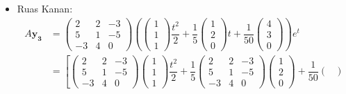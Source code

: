 \documentclass[a4paper]{article}
\theoremstyle{definisi}
\numberwithin{equation}{section}
\begin{document}
\begin{enumerate}
\begin{itemize}
\begin{align*}
\begin{pmatrix}
          \end{pmatrix}+\dfrac{1}{50}\begin{pmatrix}
            14\\23\\0
          \end{pmatrix}
        \right)e^t
      \end{align*}
      \item Ruas Kanan:
      \begin{align*}
        A\mathbf{y_3}&=\begin{pmatrix}
          2&2&-3\\
          5&1&-5\\
          -3&4&0
        \end{pmatrix}\left(\begin{pmatrix}
          1\\1\\1
        \end{pmatrix}\dfrac{t^2}{2}+\dfrac{1}{5}\begin{pmatrix}
          1\\2\\0
        \end{pmatrix}t+\dfrac{1}{50}\begin{pmatrix}
          4\\3\\0
        \end{pmatrix}\right)e^{t}\\
        &=\left[\begin{pmatrix}
          2&2&-3\\
          5&1&-5\\
          -3&4&0
        \end{pmatrix}
          \begin{pmatrix}
            1\\1\\1
          \end{pmatrix}
          \dfrac{t^2}{2}+\dfrac{1}{5}\begin{pmatrix}
            2&2&-3\\
            5&1&-5\\
            -3&4&0
          \end{pmatrix}\begin{pmatrix}
            1\\2\\0
          \end{pmatrix}+\dfrac{1}{50}\begin{pmatrix}

\end{pmatrix}
\end{align*}
\end{itemize}
\end{enumerate}
\end{document}
